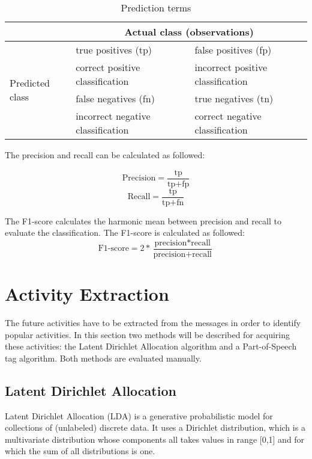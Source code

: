 \begin{table}[H]
\begin{tabular}{|l|l|l|}
\hline
& \multicolumn{2}{c|}{Actual class (observations)}\\
\hline
\multirow{4}{*}{Predicted class} & true positives (tp) & false positives (fp)\\
 & correct positive classification & incorrect positive classification\\
 \cline{2-3}
 & false negatives (fn) & true negatives (tn)\\
& incorrect negative classification& correct negative classification\\
\hline
\end{tabular}
\caption{Prediction terms}
\label{table:evaluationtable}
\end{table}

The precision and recall can be calculated as followed:

\begin{equation}
\text{Precision} = \frac{\text{tp}}{\text{tp}+\text{fp}}
\end{equation}
\begin{equation}
\text{Recall} = \frac{\text{tp}}{\text{tp}+\text{fn}}
\end{equation}

The F1-score calculates the harmonic mean between precision and recall to evaluate the classification. The F1-score is calculated as followed:
\begin{equation}
\text{F1-score} = 2 * \frac{\text{precision} * \text{recall}}{ \text{precision} + \text{recall}}
\end{equation}

\section{Activity Extraction}
The future activities have to be extracted from the messages in order to identify popular activities. In this section two methods will be described for acquiring these activities: the Latent Dirichlet Allocation algorithm and a Part-of-Speech tag algorithm. Both methods are evaluated manually.

\subsection{Latent Dirichlet Allocation}
Latent Dirichlet Allocation (LDA) is a generative probabilistic model for collections of (unlabeled) discrete data. It uses a Dirichlet distribution, which is a multivariate distribution whose components all takes values in range [0,1] and for which the sum of all distributions is one.

